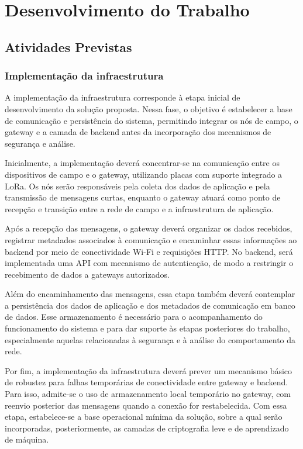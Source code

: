 \chapter{Desenvolvimento do Trabalho} \label{cap:desenvolvimento}
\section{Atividades Previstas}

\subsection{Implementação da infraestrutura}

A implementação da infraestrutura corresponde à etapa inicial de desenvolvimento da solução proposta. Nessa fase, o objetivo é estabelecer a base de comunicação e persistência do sistema, permitindo integrar os nós de campo, o gateway e a camada de backend antes da incorporação dos mecanismos de segurança e análise.

Inicialmente, a implementação deverá concentrar-se na comunicação entre os dispositivos de campo e o gateway, utilizando placas com suporte integrado a LoRa. Os nós serão responsáveis pela coleta dos dados de aplicação e pela transmissão de mensagens curtas, enquanto o gateway atuará como ponto de recepção e transição entre a rede de campo e a infraestrutura de aplicação.

Após a recepção das mensagens, o gateway deverá organizar os dados recebidos, registrar metadados associados à comunicação e encaminhar essas informações ao backend por meio de conectividade Wi-Fi e requisições HTTP. No backend, será implementada uma API com mecanismo de autenticação, de modo a restringir o recebimento de dados a gateways autorizados.

Além do encaminhamento das mensagens, essa etapa também deverá contemplar a persistência dos dados de aplicação e dos metadados de comunicação em banco de dados. Esse armazenamento é necessário para o acompanhamento do funcionamento do sistema e para dar suporte às etapas posteriores do trabalho, especialmente aquelas relacionadas à segurança e à análise do comportamento da rede.

Por fim, a implementação da infraestrutura deverá prever um mecanismo básico de robustez para falhas temporárias de conectividade entre gateway e backend. Para isso, admite-se o uso de armazenamento local temporário no gateway, com reenvio posterior das mensagens quando a conexão for restabelecida. Com essa etapa, estabelece-se a base operacional mínima da solução, sobre a qual serão incorporadas, posteriormente, as camadas de criptografia leve e de aprendizado de máquina.

